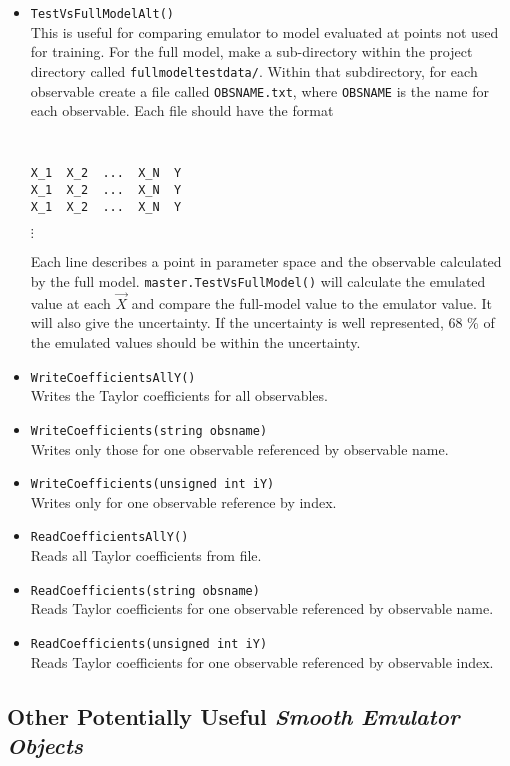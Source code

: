 \documentclass[UserManual.tex]{subfiles}
\begin{document}
\begin{itemize}
\item {\tt TestVsFullModelAlt()}\\
This is useful for comparing emulator to model evaluated at points not used for training. For the full model, make a sub-directory within the project directory called {\tt fullmodeltestdata/}. Within that subdirectory, for each observable create a file called {\tt OBSNAME.txt}, where {\tt OBSNAME} is the name for each observable. Each file should have the format
{\tt
\begin{verbatim}
X_1  X_2  ...  X_N  Y
X_1  X_2  ...  X_N  Y
X_1  X_2  ...  X_N  Y
\end{verbatim}}
\hspace*{36pt}$\vdots$

Each line describes a point in parameter space and the observable calculated by the full model. {\tt master.TestVsFullModel()} will calculate the emulated value at each $\vec{X}$ and compare the full-model value to the emulator value. It will also give the uncertainty. If the uncertainty is well represented, 68 \% of the emulated values should be within the uncertainty.

\item {\tt WriteCoefficientsAllY()}\\
Writes the Taylor coefficients for all observables.
\item {\tt WriteCoefficients(string obsname)}\\
Writes only those for one observable referenced by observable name.
\item {\tt WriteCoefficients(unsigned int iY)}\\
Writes only for one observable reference by index.
\item {\tt ReadCoefficientsAllY()}\\
Reads all Taylor coefficients from file.
\item {\tt ReadCoefficients(string obsname)}\\
Reads Taylor coefficients for one observable referenced by observable name.
\item {\tt ReadCoefficients(unsigned int iY)}\\
Reads Taylor coefficients for one observable referenced by observable index.
\end{itemize}

\subsection{Other Potentially Useful {\it Smooth Emulator Objects}}
\end{document}
